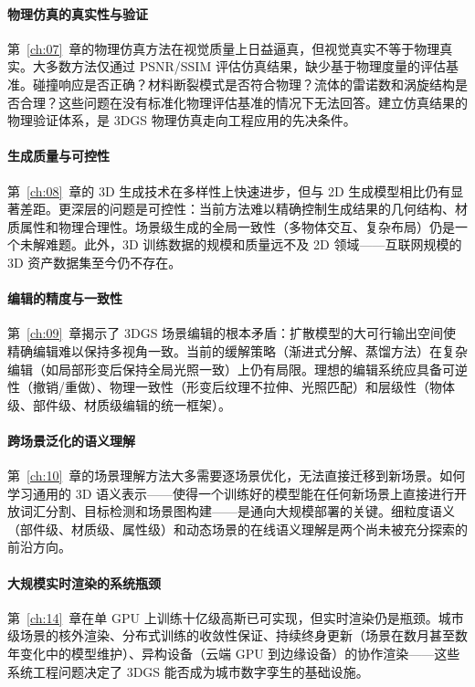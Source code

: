 \paragraph{物理仿真的真实性与验证}
第~\ref{ch:07}~章的物理仿真方法在视觉质量上日益逼真，但视觉真实不等于物理真实。大多数方法仅通过 PSNR/SSIM 评估仿真结果，缺少基于物理度量的评估基准。碰撞响应是否正确？材料断裂模式是否符合物理？流体的雷诺数和涡旋结构是否合理？这些问题在没有标准化物理评估基准的情况下无法回答。建立仿真结果的物理验证体系，是 3DGS 物理仿真走向工程应用的先决条件。

\paragraph{生成质量与可控性}
第~\ref{ch:08}~章的 3D 生成技术在多样性上快速进步，但与 2D 生成模型相比仍有显著差距。更深层的问题是可控性：当前方法难以精确控制生成结果的几何结构、材质属性和物理合理性。场景级生成的全局一致性（多物体交互、复杂布局）仍是一个未解难题。此外，3D 训练数据的规模和质量远不及 2D 领域——互联网规模的 3D 资产数据集至今仍不存在。

\paragraph{编辑的精度与一致性}
第~\ref{ch:09}~章揭示了 3DGS 场景编辑的根本矛盾：扩散模型的大可行输出空间使精确编辑难以保持多视角一致。当前的缓解策略（渐进式分解、蒸馏方法）在复杂编辑（如局部形变后保持全局光照一致）上仍有局限。理想的编辑系统应具备可逆性（撤销/重做）、物理一致性（形变后纹理不拉伸、光照匹配）和层级性（物体级、部件级、材质级编辑的统一框架）。

\paragraph{跨场景泛化的语义理解}
第~\ref{ch:10}~章的场景理解方法大多需要逐场景优化，无法直接迁移到新场景。如何学习通用的 3D 语义表示——使得一个训练好的模型能在任何新场景上直接进行开放词汇分割、目标检测和场景图构建——是通向大规模部署的关键。细粒度语义（部件级、材质级、属性级）和动态场景的在线语义理解是两个尚未被充分探索的前沿方向。

\paragraph{大规模实时渲染的系统瓶颈}
第~\ref{ch:14}~章在单 GPU 上训练十亿级高斯已可实现，但实时渲染仍是瓶颈。城市级场景的核外渲染、分布式训练的收敛性保证、持续终身更新（场景在数月甚至数年变化中的模型维护）、异构设备（云端 GPU 到边缘设备）的协作渲染——这些系统工程问题决定了 3DGS 能否成为城市数字孪生的基础设施。

